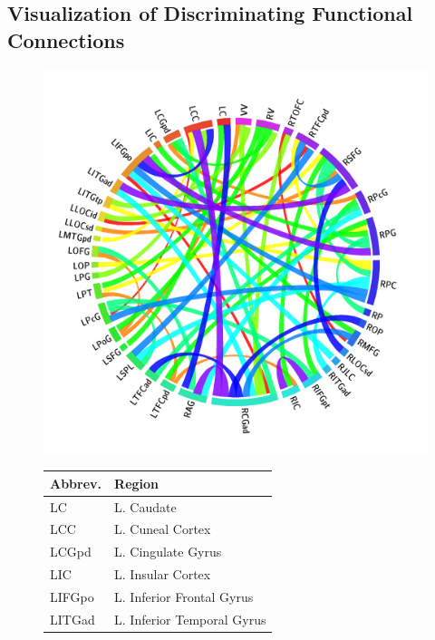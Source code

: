 \documentclass{llncs}
\begin{document}
\subsection{Visualization of Discriminating Functional Connections}

\begin{figure}[htb]
\begin{minipage}[b]{.6\linewidth}
\centering
	\includegraphics[scale = .11]{now_circos3.png}
	\par\vspace{0pt}
\end{minipage}
\begin{minipage}[b]{.4\linewidth}
\centering
\tiny
\begin{tabular}{l l}
\hline
Abbrev. & Region\\
\hline
LC	& L. Caudate\\
LCC	& L. Cuneal Cortex\\
LCGpd	& L. Cingulate Gyrus\\
LIC	& L. Insular Cortex\\
LIFGpo	& L. Inferior Frontal Gyrus\\
LITGad	& L. Inferior Temporal Gyrus\\

\end{tabular}
\end{minipage}
\end{figure}
\end{document}
